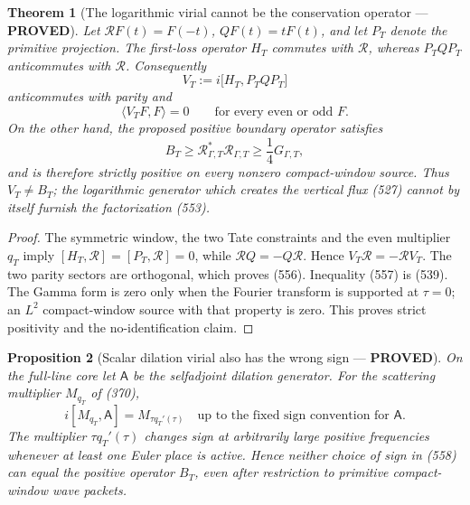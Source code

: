 \documentclass[11pt]{article}
\newtheorem{theorem}{Theorem}
\newtheorem{proposition}[theorem]{Proposition}
\newcommand{\PROVED}{\textcolor{green!45!black}{\textbf{PROVED}}}
\begin{document}
\begin{theorem}[The logarithmic virial cannot be the conservation operator
--- \PROVED]
Let \(\mathcal R F(t)=F(-t)\), \(QF(t)=tF(t)\), and let \(P_T\) denote
the primitive projection.  The first-loss operator \(H_T\) commutes with
\(\mathcal R\), whereas \(P_TQP_T\) anticommutes with \(\mathcal R\).
Consequently
\begin{equation}
 V_T:=i\bigl[H_T,P_TQP_T\bigr]                        \tag{555}
\end{equation}
anticommutes with parity and
\begin{equation}
 \langle V_TF,F\rangle=0
 \qquad\text{for every even or odd }F.                \tag{556}
\end{equation}
On the other hand, the proposed positive boundary operator satisfies
\begin{equation}
 B_T\ge\mathcal R_{\Gamma,T}^*\mathcal R_{\Gamma,T}
 \ge\frac14G_{\Gamma,T},                              \tag{557}
\end{equation}
and is therefore strictly positive on every nonzero compact-window source.
Thus \(V_T\ne B_T\); the logarithmic generator which creates the vertical
flux (527) cannot by itself furnish the factorization (553).
\end{theorem}

\begin{proof}
The symmetric window, the two Tate constraints and the even multiplier
\(q_T\) imply \([H_T,\mathcal R]=[P_T,\mathcal R]=0\), while
\(\mathcal RQ=-Q\mathcal R\).  Hence \(V_T\mathcal R=-\mathcal RV_T\).
The two parity sectors are orthogonal, which proves (556).  Inequality
(557) is (539).  The Gamma form is zero only when the Fourier transform is
supported at \(\tau=0\); an \(L^2\) compact-window source with that property
is zero.  This proves strict positivity and the no-identification claim.
\end{proof}

\begin{proposition}[Scalar dilation virial also has the wrong sign ---
\PROVED]
On the full-line core let \(\mathsf A\) be the selfadjoint dilation
generator.  For the scattering multiplier \(M_{q_T}\) of (370),
\begin{equation}
 i[M_{q_T},\mathsf A]=M_{\tau q_T'(\tau)}
 \quad\text{up to the fixed sign convention for }\mathsf A.  \tag{558}
\end{equation}
The multiplier \(\tau q_T'(\tau)\) changes sign at arbitrarily large
positive frequencies whenever at least one Euler place is active.  Hence
neither choice of sign in (558) can equal the positive operator \(B_T\),
even after restriction to primitive compact-window wave packets.
\end{proposition}
\end{document}
